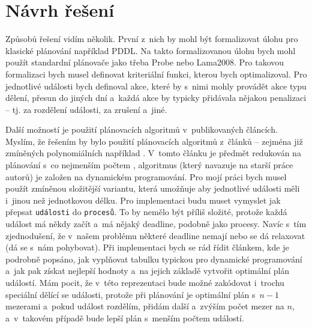 \documentclass[a4paper,11pt]{article}
\begin{document}
\section*{Návrh řešení}
Způsobů řešení vidím několik. První z~nich by mohl být formalizovat úlohu pro klasické plánování například PDDL. Na takto formalizovanou úlohu bych mohl použít standardní plánovače jako třeba Probe nebo Lama2008. Pro takovou formalizaci bych musel definovat kriteriální funkci, kterou bych optimalizoval. Pro jednotlivé události bych definoval akce, které by s~nimi mohly provádět akce typu dělení, přesun do jiných dní a~každá akce by typicky přidávala nějakou penalizaci -- tj. za rozdělení události, za zrušení a~jiné.

Další možností je použití plánovacích algoritmů v~publikovaných článcích. Myslím, že řešením by bylo použití plánovacích algoritmů z~článků -- zejména již zmíněných polynomiálních například \linebreak \cite{polyEnergy}. V~tomto článku je předmět redukován na plánování s~co nejmenším počtem , algoritmus (který navazuje na starší práce autorů) je založen na dynamickém programování. Pro mojí práci bych musel použít zmíněnou složitější variantu, která umožňuje aby jednotlivé události měli i~jinou než jednotkovou délku. Pro implementaci budu muset vymyslet jak přepsat \texttt{události} do \texttt{procesů}. To by nemělo být příliš složité, protože každá událost má někdy začít a~má nějaký deadline, podobně jako procesy. Navíc s~tím zjednodušení, že v~našem problému některé deadline nemají nebo se dá relaxovat (dá se s~nám pohybovat). Při implementaci bych se rád řídit článkem, kde je podrobně popsáno, jak vyplňovat tabulku typickou pro dynamické programování a~jak pak získat nejlepší hodnoty a~na jejich základě vytvořit optimální plán událostí. Mám pocit, že v~této reprezentaci bude možné zakódovat i~trochu speciální dělící se události, protože při plánování je optimální plán s~$n-1$ mezerami a~pokud událost rozdělím, přidám další a~zvýším počet mezer na $n$, a~v~takovém případě bude lepší plán s~menším počtem událostí.
\end{document}
